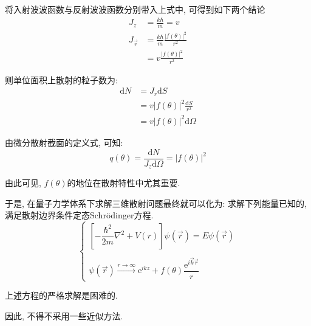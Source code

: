 \documentclass[a4paper, 11pt]{article}
\begin{document}
\begin{spacing}{1.2}
          将入射波波函数与反射波波函数分别带入上式中, 可得到如下两个结论
          \begin{equation}
            \begin{aligned}
              J_z &= \frac{k\hbar}{m} = v\\
              J_{\vec{r}} &= \frac{k\hbar}{m}\frac{|f(\theta)|^2}{r^2}\\
                          &= v\frac{|f(\theta)|^2}{r^2}
            \end{aligned}
          \end{equation}

          则单位面积上散射的粒子数为:
          \begin{equation}
            \begin{aligned}
              \mathrm{d}N &= J_r\mathrm{d}S \\
                          &= v|f(\theta)|^2\frac{\mathrm{d}S}{r^2}\\
                          &= v|f(\theta)|^2\mathrm{d}\Omega
            \end{aligned}
          \end{equation}

          由微分散射截面的定义式, 可知:
          \begin{equation}
            \label{fandq}
            q(\theta) = \frac{\mathrm{d}N}{J_z\mathrm{d}\Omega} = |f(\theta)|^2
          \end{equation}

          由此可见, $f(\theta)$的地位在散射特性中尤其重要. 

          于是, 在量子力学体系下求解三维散射问题最终就可以化为:
          求解下列能量已知的, 满足散射边界条件定态Schr\"odinger方程. 
          \begin{equation}
            \label{3.2.1:corequestion}
            \left\{
              \begin{array}{l}
              \left[-\dfrac{\hbar^2}{2m}\nabla^2+V(r)\right]\psi(\vec{r}) = E\psi(\vec{r})\\ \ \\
              \psi(\vec{r}) \overset{r\to\infty}{\longrightarrow}\mathrm{e}^{ikz} + f(\theta)\dfrac{\mathrm{e}^{i\vec{k}\vec{r}}}{r}
              \end{array} \right. 
          \end{equation}
 
          上述方程的严格求解是困难的.
          
          因此, 不得不采用一些近似方法. 


\end{spacing}
\end{document}
